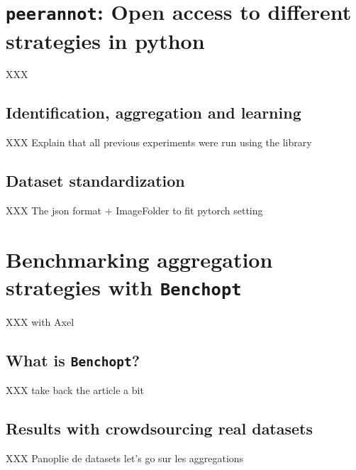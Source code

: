 \section{\texttt{peerannot}: Open access to different strategies in python}
XXX
\subsection{Identification, aggregation and learning}
XXX
Explain that all previous experiments were run using the library

\subsection{Dataset standardization}
XXX
The json format + ImageFolder to fit pytorch setting 

\section{Benchmarking aggregation strategies with \texttt{Benchopt}}
XXX with Axel
\subsection{What is \texttt{Benchopt}?}
XXX take back the article a bit

\subsection{Results with crowdsourcing real datasets}
XXX Panoplie de datasets let's go sur les aggregations 